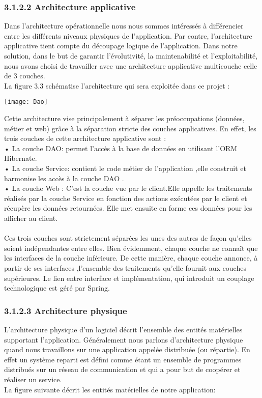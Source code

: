 \documentclass[a4paper,12pt,oneside]{report}
\begin{document}
 \subsubsection{3.1.2.2 Architecture applicative}
Dans l'architecture opérationnelle nous nous sommes intéressés à différencier entre les différents niveaux physiques de l'application. Par contre, l'architecture applicative tient compte du découpage logique de l'application. Dans notre solution, dans le but de garantir l'évolutivité, la maintenabilité et l’exploitabilité, nous avons choisi de travailler avec une architecture applicative multicouche celle de 3 couches. \\
La figure 3.3 schématise l'architecture qui sera exploitée dans ce projet :
\begin{center}
\texttt{[image: Dao]}

\label{fig1}
\end{center}
Cette architecture vise principalement  à séparer les préoccupations (données, métier et web) grâce à la séparation stricte des couches applicatives. En effet, les trois couches de cette architecture applicative sont : \\
• La couche DAO: permet l'accès à la base de données en utilisant l'ORM Hibernate.\\
• La couche Service: contient le code métier de l'application ,elle construit et harmonise les accès à la couche DAO . \\
• La couche Web : C'est la couche vue par le client.Elle appelle les traitements réalisés par la couche Service en fonction des actions exécutées par le client et récupère les données retournées. Elle met ensuite en forme ces données pour les afficher au client. \\
\\
Ces trois couches sont strictement séparées les unes des autres de façon qu'elles soient indépendantes entre elles. Bien évidemment, chaque couche ne connaît que les interfaces de la couche  inférieure. De cette manière, chaque couche annonce, à partir de ses interfaces ,l'ensemble des traitements qu'elle fournit aux couches supérieures.
Le lien entre interface et implémentation, qui introduit un couplage technologique est géré par Spring.
\subsubsection{3.1.2.3 Architecture physique }
L'architecture physique d'un logiciel décrit l'ensemble des entités matérielles  supportant l'application.
Généralement nous parlons d'architecture physique quand nous travaillons sur une application appelée distribuée (ou répartie).
En effet un système reparti est défini comme étant un ensemble de programmes distribués sur un réseau de communication et qui a pour but de coopérer et réaliser un service. \\ 
La figure suivante décrit les entités  matérielles de notre application: 
\end{document}
